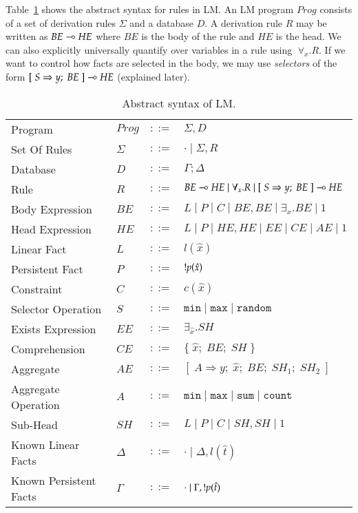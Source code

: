 
\newcommand{\selector}[0]{[\; S \Rightarrow y; \; BE \;] \lolli HE}
\newcommand{\comprehension}[0]{\{ \; \widehat{x}; \; BE; \; SH \; \}}
\newcommand{\aggregate}[0]{[\; A \Rightarrow y; \; \widehat{x}; \; BE; \; SH_1; \; SH_2 \;]}

Table~\ref{tbl:ast} shows the abstract syntax for rules in LM.
An LM program $Prog$ consists of a set of derivation rules $\Sigma$ and a database $D$.
A derivation rule $R$ may be written as $BE \multimap HE$ where $BE$ is the body of the rule and
$HE$ is the head.
We can also explicitly universally quantify over variables in a rule using $\; \forall_{x}. R$.
If we want to control how facts are selected in the body, we may use \emph{selectors} of
the form $\selector$ (explained later).

\begin{table}[h]
\centering
\begin{tabular}{ l l c l }
  Program & $Prog$ & $::=$ & $\Sigma, D$ \\
  Set Of Rules & $\Sigma$ & $::=$ & $\cdot \; | \; \Sigma, R$\\
  Database & $D$ & $::=$ & $\Gamma; \Delta$ \\
  Rule & $R$ & $::=$ & $BE \lolli HE \; | \; \forall_{x}. R \; | \; \selector$ \\
  Body Expression & $BE$ & $::=$ & $L \; | \; P \; | \; C \; | \; BE, BE \; | \; \exists_{x}. BE \; | \; 1$\\
  Head Expression & $HE$ & $::=$ & $L \; | \; P \; | \; HE, HE \; | \; EE \; | \; CE \; | \; AE \; | \; 1$\\
  
  Linear Fact & $L$ & $::=$ & $l(\hat{x})$\\
  Persistent Fact & $P$ & $::=$ & ${!} p(\hat{x})$\\
  Constraint & $C$ & $::=$ & $c(\hat{x})$ \\
  Selector Operation & $S$ & $::=$ & $\mathtt{min} \; | \; \mathtt{max} \; | \; \mathtt{random}$\\
  
  Exists Expression & $EE$ & $::=$ & $\exists_{\widehat{x}}. SH$ \\
  Comprehension & $CE$ & $::=$ & $\comprehension$ \\
  Aggregate & $AE$ & $::=$ & $\aggregate$ \\
  Aggregate Operation & $A$ & $::=$ & $\mathtt{min} \; | \; \mathtt{max} \; | \; \mathtt{sum} \; | \; \mathtt{count}$ \\
  
  Sub-Head & $SH$ & $::=$ & $L \; | \; P \; | \; C \; | \; SH, SH \; | \; 1$\\
  
  Known Linear Facts & $\Delta$ & $::=$ & $\cdot \; | \; \Delta, l(\hat{t})$ \\
  Known Persistent Facts & $\Gamma$ & $::=$ & $\cdot \; | \; \Gamma, {!} p(\hat{t})$ \\
\end{tabular}
\caption{Abstract syntax of LM.}\label{tbl:ast}
\end{table}

